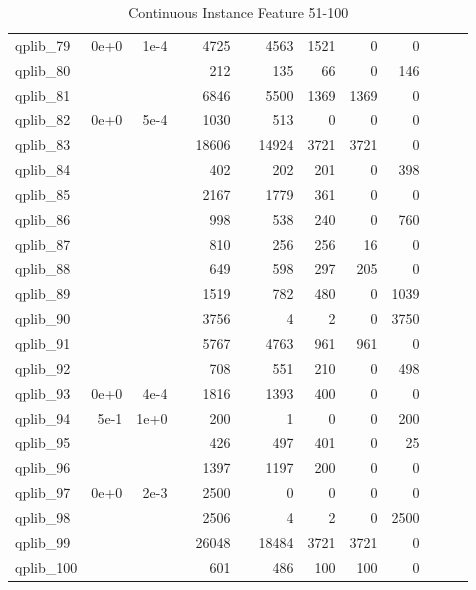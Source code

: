 \begin{table}
\begin{tabular}{lrrrrrrrrrrrr}
qplib\_79	&	0e+0	&	1e-4	&	&	4725	&	&	4563	&	1521	&	0	&	0	\\
qplib\_80	&		&		&	&	212	&	&	135	&	66	&	0	&	146	\\
qplib\_81	&		&		&	&	6846	&	&	5500	&	1369	&	1369	&	0	\\
qplib\_82	&	0e+0	&	5e-4	&	&	1030	&	&	513	&	0	&	0	&	0	\\
qplib\_83	&		&		&	&	18606	&	&	14924	&	3721	&	3721	&	0	\\
qplib\_84	&		&		&	&	402	&	&	202	&	201	&	0	&	398	\\
qplib\_85	&		&		&	&	2167	&	&	1779	&	361	&	0	&	0	\\
qplib\_86	&		&		&	&	998	&	&	538	&	240	&	0	&	760	\\
qplib\_87	&		&		&	&	810	&	&	256	&	256	&	16	&	0	\\
qplib\_88	&		&		&	&	649	&	&	598	&	297	&	205	&	0	\\
qplib\_89	&		&		&	&	1519	&	&	782	&	480	&	0	&	1039	\\
qplib\_90	&		&		&	&	3756	&	&	4	&	2	&	0	&	3750	\\
qplib\_91	&		&		&	&	5767	&	&	4763	&	961	&	961	&	0	\\
qplib\_92	&		&		&	&	708	&	&	551	&	210	&	0	&	498	\\
qplib\_93	&	0e+0	&	4e-4	&	&	1816	&	&	1393	&	400	&	0	&	0	\\
qplib\_94	&	5e-1	&	1e+0	&	&	200	&	&	1	&	0	&	0	&	200	\\
qplib\_95	&		&		&	&	426	&	&	497	&	401	&	0	&	25	\\
qplib\_96	&		&		&	&	1397	&	&	1197	&	200	&	0	&	0	\\
qplib\_97	&	0e+0	&	2e-3	&	&	2500	&	&	0	&	0	&	0	&	0	\\
qplib\_98	&		&		&	&	2506	&	&	4	&	2	&	0	&	2500	\\
qplib\_99	&		&		&	&	26048	&	&	18484	&	3721	&	3721	&	0	\\
qplib\_100	&		&		&	&	601	&	&	486	&	100	&	100	&	0	\\


\bottomrule

\end{tabular}  
\label{tab:B2}
\caption{Continuous  Instance Feature 51-100} 

\end{table}

